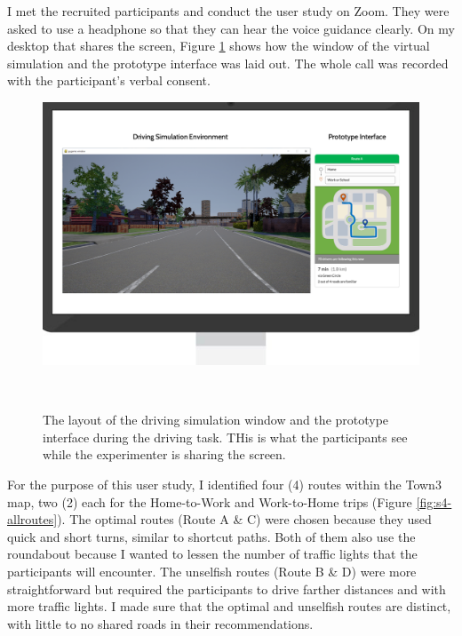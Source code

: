 
I met the recruited participants and conduct the user study on Zoom. They were asked to use a headphone so that they can hear the voice guidance clearly. On my desktop that shares the screen, Figure \ref{fig:s4-setup} shows how the window of the virtual simulation and the prototype interface was laid out. The whole call was recorded with the participant's verbal consent.

\begin{figure}[h]
\centering
  \includegraphics[scale=.45]{figures/s4-setup.png}
  \caption{The layout of the driving simulation window and the prototype interface during the driving task. THis is what the participants see while the experimenter is sharing the screen.}~\label{fig:s4-setup}
\end{figure}

For the purpose of this user study, I identified four (4) routes within the Town3 map, two (2) each for the Home-to-Work and Work-to-Home trips (Figure \ref{fig:s4-allroutes}). The optimal routes (Route A \& C) were chosen because they used quick and short turns, similar to shortcut paths. Both of them also use the roundabout because I wanted to lessen the number of traffic lights that the participants will encounter. The unselfish routes (Route B \& D) were more straightforward but required the participants to drive farther distances and with more traffic lights. I made sure that the optimal and unselfish routes are distinct, with little to no shared roads in their recommendations. 

